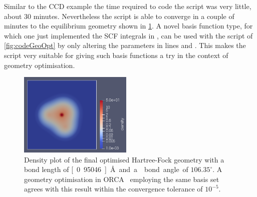 Similar to the CCD example the time required to code the script
was very little, about 30 minutes.
Nevertheless the script is able to converge
in a couple of minutes to the equilibrium geometry shown
in \fig \ref{fig:OptimalGeometryWater}.
A novel basis function type,
for which one just implemented the SCF integrals in \gint,
can be used with the script of \fig \ref{fig:codeGeoOpt}
by only altering the parameters in lines \lgbasone and \lgbastwo.
This makes the script very suitable for giving such basis functions
a try in the context of geometry optimisation.

\begin{figure}
	\centering
	\includegraphics[width=0.48\textwidth]{h2o_density.png}
	\caption{Density plot of the final optimised 
	Hartree-Fock geometry with a
	 bond length of \unit[0.95046]{\AA} and
	a  bond angle of $106.35^\circ$.
	A geometry optimisation in ORCA~\cite{ORCA}
	employing the same basis set
	agrees with this result within the convergence tolerance of $10^{-5}$.
	}
	\label{fig:OptimalGeometryWater}
\end{figure}

